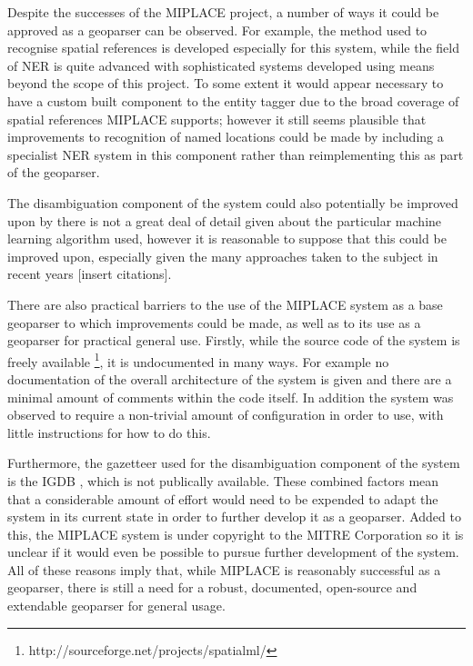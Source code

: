 \documentclass[12pt, a4paper]{report}
\begin{document}
Despite the successes of the MIPLACE project, a number of ways it could be approved as a geoparser can be observed. For example, the method used to recognise spatial references is developed especially for this system, while the field of NER is quite advanced with sophisticated systems developed using means beyond the scope of this project. To some extent it would appear necessary to have a custom built component to the entity tagger due to the broad coverage of spatial references MIPLACE supports; however it still seems plausible that improvements to recognition of named locations could be made by including a specialist NER system in this component rather than reimplementing this as part of the geoparser.



The disambiguation component of the system could also potentially be improved upon by there is not a great deal of detail given about the particular machine learning algorithm used, however it is reasonable to suppose that this could be improved upon, especially given the many approaches taken to the subject in recent years [insert citations].

There are also practical barriers to the use of the MIPLACE system as a base geoparser to which improvements could be made, as well as to its use as a geoparser for practical general use. Firstly, while the source code of the system is freely available \footnote{http://sourceforge.net/projects/spatialml/}, it is undocumented in many ways. For example no documentation of the overall architecture of the system is given and there are a minimal amount of comments within the code itself. In addition the system was observed to require a non-trivial amount of configuration in order to use, with little instructions for how to do this. 

Furthermore, the gazetteer used for the disambiguation component of the system is the IGDB \citep{igdb2005}, which is not publically available. These combined factors mean that a considerable amount of effort would need to be expended to adapt the system in its current state in order to further develop it as a geoparser. Added to this, the MIPLACE system is under copyright to the MITRE Corporation so it is unclear if it would even be possible to pursue further development of the system. All of these reasons imply that, while MIPLACE is reasonably successful as a geoparser, there is still a need for a robust, documented, open-source and extendable geoparser for general usage.
\end{document}

